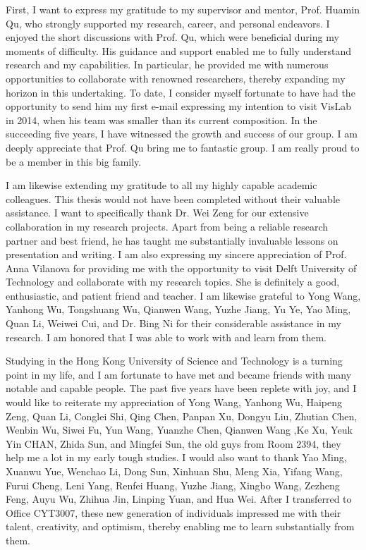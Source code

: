 \acknowledgments
First, I   want to express my gratitude to my supervisor and mentor, Prof. Huamin Qu, who strongly supported my research, career, and personal endeavors. I enjoyed the short discussions with Prof. Qu, which were beneficial during my moments of difficulty. His guidance and support enabled me to fully understand research and my capabilities. In particular, he provided me with numerous opportunities to collaborate with renowned researchers, thereby expanding my horizon in this undertaking. To date, I consider myself fortunate to have had the opportunity to send him my first e-mail expressing my intention to visit VisLab in 2014, when his team was smaller than its current composition. In the succeeding five years, I have witnessed the growth and success of our group. I am deeply appreciate that Prof. Qu bring me to fantastic group. I am really proud to be a member in this big family. 

I am likewise extending my gratitude to all my highly capable academic colleagues. This thesis would not have been completed without their valuable assistance. 
I want to specifically thank Dr. Wei Zeng for our extensive collaboration in my research projects. Apart from being a reliable research partner and best friend, he has taught me substantially invaluable lessons on presentation and writing. 
I am also expressing my sincere appreciation of Prof. Anna Vilanova for providing me with the opportunity to visit Delft University of Technology and collaborate with my research topics. She is definitely a good, enthusiastic, and patient friend and teacher. 
I am likewise grateful to Yong Wang, Yanhong Wu, Tongshuang Wu, Qianwen Wang, Yuzhe Jiang, Yu Ye, Yao Ming, Quan Li, Weiwei Cui, and Dr. Bing Ni for their considerable assistance in my research. I am honored that I was able to work with and learn from them. 

Studying in the Hong Kong University of Science and Technology is a turning point in my life, and I am fortunate to have met and became friends with many notable and capable people. 
The past five years have been replete with joy, and I would like to reiterate my appreciation of Yong Wang, Yanhong Wu, Haipeng Zeng, Quan Li, Conglei Shi, Qing Chen, Panpan Xu, Dongyu Liu, Zhutian Chen, Wenbin Wu, Siwei Fu, Yun Wang, Yuanzhe Chen, Qianwen Wang ,Ke Xu, Yeuk Yin CHAN, Zhida Sun, and Mingfei Sun, the old guys from Room 2394, they help me a lot in my early tough studies. I would also want to thank Yao Ming, Xuanwu Yue, Wenchao Li, Dong Sun, Xinhuan Shu, Meng Xia, Yifang Wang, Furui Cheng, Leni Yang, Renfei Huang, Yuzhe Jiang, Xingbo Wang, Zezheng Feng, Auyu Wu, Zhihua Jin, Linping Yuan, and Hua Wei. After I transferred to Office CYT3007, these new generation of individuals impressed me with their talent, creativity, and optimism, thereby enabling me to learn substantially from them. 

